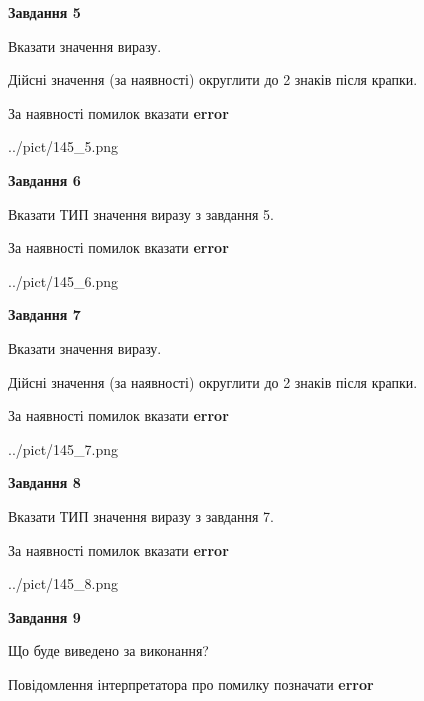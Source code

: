 \documentclass[11pt, ukrainian]{article}
\begin{document}
{\begin {large}
{\begin {center}\textbf{Завдання 5}\end {center}}\par
Вказати значення виразу. \par
Дійсні значення (за наявності) округлити до 2 знаків після крапки. \par
За наявності помилок вказати \textbf{error}

\begin{center}
	{../pict/145_5.png}
\end{center}
\newpage

{\begin {center}\textbf{Завдання 6}\end {center}}\par
Вказати ТИП значення виразу з завдання 5. \par
За наявності помилок вказати \textbf{error}

\begin{center}
	{../pict/145_6.png}
\end{center}
\newpage

{\begin {center}\textbf{Завдання 7}\end {center}}\par
Вказати значення виразу. \par
Дійсні значення (за наявності) округлити до 2 знаків після крапки. \par
За наявності помилок вказати \textbf{error}

\begin{center}
	{../pict/145_7.png}
\end{center}
\newpage

{\begin {center}\textbf{Завдання 8}\end {center}}\par
Вказати ТИП значення виразу з завдання 7. \par
За наявності помилок вказати \textbf{error}

\begin{center}
	{../pict/145_8.png}
\end{center}
\newpage

{\begin {center}\textbf{Завдання 9}\end {center}}\par
Що буде виведено за виконання? \par
Повідомлення інтерпретатора про помилку позначати \textbf{error}


\end{large}}
\end{document}
